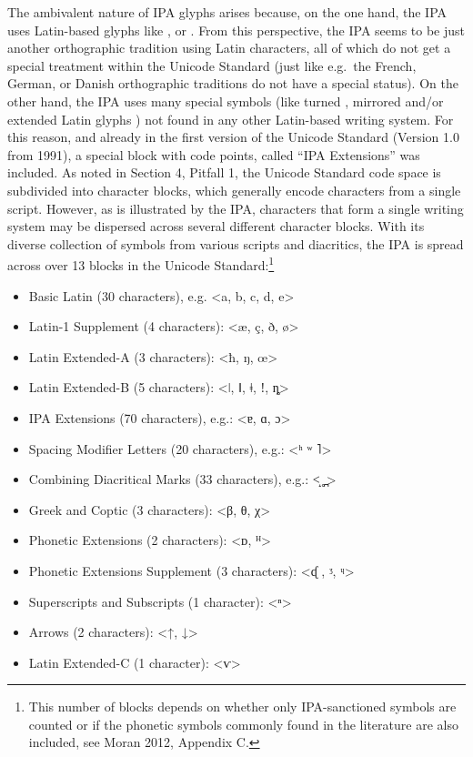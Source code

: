 The ambivalent nature of IPA glyphs arises because, on the one hand, the IPA uses Latin-based glyphs like , or . From this perspective, the IPA seems to be just another orthographic tradition using Latin characters, all of which do not get a special treatment within the Unicode Standard (just like e.g.~the French, German, or Danish orthographic traditions do not have a special status). On the other hand, the IPA uses many special symbols (like turned , mirrored and/or extended Latin glyphs ) not found in any other Latin-based writing system. For this reason, and already in the first version of the Unicode Standard (Version 1.0 from 1991), a special block with code points, called ``IPA Extensions'' was included. As noted in Section 4, Pitfall 1, the Unicode Standard code space is subdivided into character blocks, which generally encode characters from a single script. However, as is illustrated by the IPA, characters that form a single writing system may be dispersed across several different character blocks. With its diverse collection of symbols from various scripts and diacritics, the IPA is spread across over 13 blocks in the Unicode Standard:\footnote{This number of blocks depends on whether only IPA-sanctioned symbols are counted or if the phonetic symbols commonly found in the literature are also included, see Moran 2012, Appendix C.}
\begin{itemize}
	\item Basic Latin (30 characters), e.g. <a, b, c, d, e> 
	\item Latin-1 Supplement (4 characters): <æ, ç, ð, ø\textgreater{} 
	\item Latin Extended-A (3 characters): <ħ, ŋ, œ> 
	\item Latin Extended-B (5 characters): <ǀ, ǁ, ǂ, ǃ, ȵ> 
	\item IPA Extensions (70 characters), e.g.: <ɐ, ɑ, ɔ> 
	\item Spacing Modifier Letters (20 characters), e.g.: <ʰ ʷ ˥> 
	\item Combining Diacritical Marks (33 characters), e.g.: <̝ ̥ ̪> 
	\item Greek and Coptic (3 characters): <β, θ, χ> 
	\item Phonetic Extensions (2 characters): <ᴅ, ᴴ> 
	\item Phonetic Extensions Supplement (3 characters): <ᶑ , ᶾ, ᶣ> 
	\item Superscripts and Subscripts (1 character): <ⁿ> 
	\item Arrows (2 characters): \textless{}↑, ↓\textgreater{} 
	\item Latin Extended-C (1 character): <ⱱ> 
\end{itemize}


